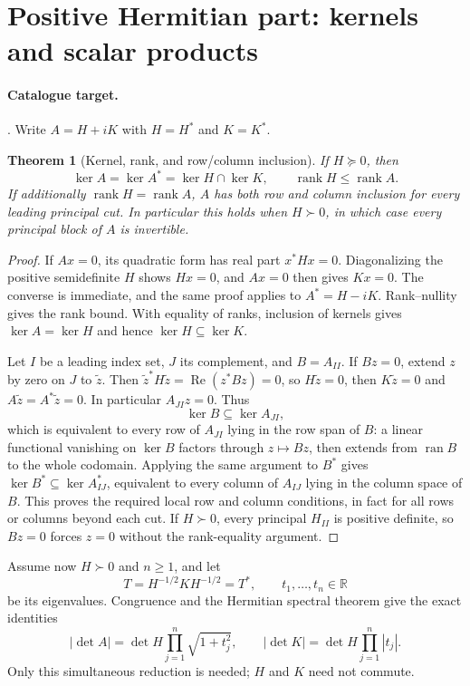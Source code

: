 \documentclass[11pt,a4paper]{article}
\newtheorem{theorem}{Theorem}[section]
\theoremstyle{definition}
\newcommand{\R}{\mathbb R}
\DeclareMathOperator{\rank}{rank}
\DeclareMathOperator{\ran}{ran}
\newcommand{\code}[1]{\ifmmode\text{\small\nolinkurl{#1}}\else{\small\nolinkurl{#1}}\fi}
\begin{document}
\section{Positive Hermitian part: kernels and scalar products}
\label{struct:accretive}
\paragraph{Catalogue target.} \code{psd-hermitian-part}.
Write $A=H+iK$ with $H=H^*$ and $K=K^*$.

\begin{theorem}[Kernel, rank, and row/column inclusion]
If $H\succeq0$, then
\[
 \ker A=\ker A^*=\ker H\cap\ker K,
 \qquad \rank H\le\rank A.
 \tag{S12}
\]
If additionally $\rank H=\rank A$, $A$ has both row and column
inclusion for every leading principal cut. In particular this holds
when $H\succ0$, in which case every principal block of $A$ is invertible.
\end{theorem}
\begin{proof}
If $Ax=0$, its quadratic form has real part $x^*Hx=0$.
Diagonalizing the positive semidefinite $H$ shows $Hx=0$,
and $Ax=0$ then gives $Kx=0$. The converse is immediate, and the
same proof applies to $A^*=H-iK$. Rank--nullity gives the rank bound.
With equality of ranks, inclusion of kernels gives
$\ker A=\ker H$ and hence $\ker H\subseteq\ker K$.

Let $I$ be a leading index set, $J$ its complement, and
$B=A_{II}$. If $Bz=0$, extend $z$ by zero on $J$ to $\widetilde z$.
Then $\widetilde z^*H\widetilde z=\operatorname{Re}(z^*Bz)=0$,
so $H\widetilde z=0$, then $K\widetilde z=0$ and
$A\widetilde z=A^*\widetilde z=0$. In particular
$A_{JI}z=0$. Thus
\[
 \ker B\subseteq\ker A_{JI},
\]
which is equivalent to every row of $A_{JI}$ lying in the row span
of $B$: a linear functional vanishing on $\ker B$ factors through
$z\mapsto Bz$, then extends from $\ran B$ to the whole codomain.
Applying the same argument to $B^*$ gives
$\ker B^*\subseteq\ker A_{IJ}^*$, equivalent to every column of
$A_{IJ}$ lying in the column space of $B$.
This proves the required local row and column conditions, in fact
for all rows or columns beyond each cut.
If $H\succ0$, every principal $H_{II}$ is positive definite,
so $Bz=0$ forces $z=0$ without the rank-equality argument.
\end{proof}

Assume now $H\succ0$ and $n\ge1$, and let
\[
 T=H^{-1/2}KH^{-1/2}=T^*,\qquad t_1,\ldots,t_n\in\R
\]
be its eigenvalues. Congruence and the Hermitian spectral theorem give
the exact identities
\[
 |\det A|=\det H\prod_{j=1}^n\sqrt{1+t_j^2},\qquad
 |\det K|=\det H\prod_{j=1}^n|t_j|.
 \tag{S13}
\]
Only this simultaneous reduction is needed; $H$ and $K$ need not commute.
\end{document}
